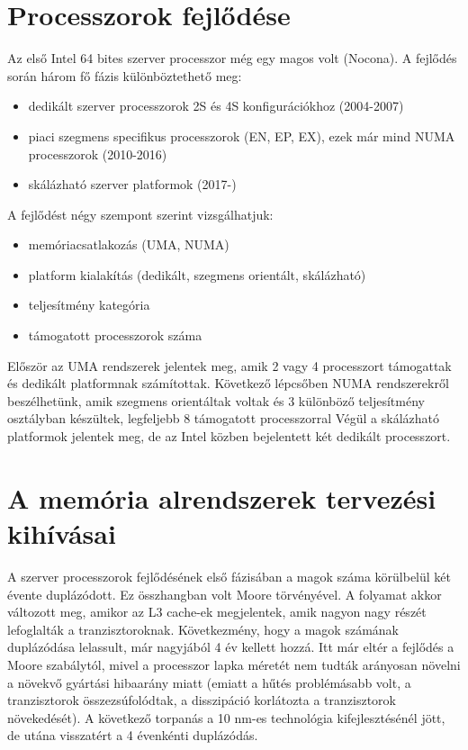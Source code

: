 \section{Processzorok fejlődése}
Az első Intel 64 bites szerver processzor még egy magos volt (Nocona).
A fejlődés során három fő fázis különböztethető meg:
\begin{itemize}
    \item dedikált szerver processzorok 2S és 4S konfigurációkhoz (2004-2007)
    \item piaci szegmens specifikus processzorok (EN, EP, EX), ezek már mind NUMA processzorok (2010-2016)
    \item skálázható szerver platformok (2017-)
\end{itemize}

A fejlődést négy szempont szerint vizsgálhatjuk:
\begin{itemize}
    \item memóriacsatlakozás (UMA, NUMA)
    \item platform kialakítás (dedikált, szegmens orientált, skálázható)
    \item teljesítmény kategória
    \item támogatott processzorok száma 
\end{itemize}
Először az UMA rendszerek jelentek meg, amik 2 vagy 4 processzort támogattak és dedikált platformnak számítottak.
Következő lépcsőben NUMA rendszerekről beszélhetünk, amik szegmens orientáltak voltak és 3 különböző teljesítmény osztályban készültek, legfeljebb 8 támogatott processzorral
Végül a skálázható platformok jelentek meg, de az Intel közben bejelentett két dedikált processzort.

\section{A memória alrendszerek tervezési kihívásai}
A szerver processzorok fejlődésének első fázisában a magok száma körülbelül két évente duplázódott.
Ez összhangban volt Moore törvényével.
A folyamat akkor változott meg, amikor az L3 cache-ek megjelentek, amik nagyon nagy részét lefoglalták a tranzisztoroknak.
Következmény, hogy a magok számának duplázódása lelassult, már nagyjából 4 év kellett hozzá.
Itt már eltér a fejlődés a Moore szabálytól, mivel a processzor lapka méretét nem tudták arányosan növelni a növekvő gyártási hibaarány miatt (emiatt a hűtés problémásabb volt, a tranzisztorok összezsúfolódtak, a disszipáció korlátozta a tranzisztorok növekedését).
A következő torpanás a 10 nm-es technológia kifejlesztésénél jött, de utána visszatért a 4 évenkénti duplázódás.

